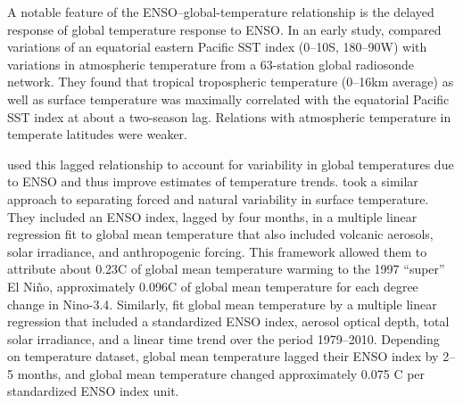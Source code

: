 \documentclass{ametsocV6.1}
\begin{document}
A notable feature of the ENSO–global-temperature relationship
    is the delayed response of global temperature response to ENSO. In an early study, \citet{Angell1981comparison} compared
    variations of an equatorial eastern Pacific SST index
    (0--10\textdegree S, 180\textdegree--90\textdegree W) with
    variations in atmospheric temperature from a 63-station global
    radiosonde network. They found that tropical tropospheric
    temperature (0--16km average) as well as surface temperature was
    maximally correlated with the equatorial Pacific SST index at
    about a two-season lag.  Relations with atmospheric temperature in
    temperate latitudes were weaker.

  

\citet{Angell2000tropospheric} used this lagged relationship
    to account for variability in global temperatures due to ENSO and
    thus improve estimates of temperature trends. \citet{Lean2008natural} took a similar approach to separating
    forced and natural variability in surface temperature. They
    included an ENSO index, lagged by four months, in a multiple linear
    regression fit to global mean temperature that also included
    volcanic aerosols, solar irradiance, and anthropogenic
    forcing. This framework allowed them to attribute about
    0.23\textdegree C of global mean temperature warming to the 1997
    ``super'' El Ni\~no, approximately 0.096\textdegree C of global
    mean temperature for each degree change in Nino-3.4. Similarly, \citet{Foster2011global} fit global mean
    temperature by a multiple linear regression that included a
    standardized ENSO index, aerosol optical depth, total solar
    irradiance, and a linear time trend over the period
    1979--2010. Depending on temperature dataset, global mean
    temperature lagged their ENSO index by 2--5 months, and global
    mean temperature changed approximately 0.075 \textdegree C per
    standardized ENSO index unit.

  
  
\end{document}
